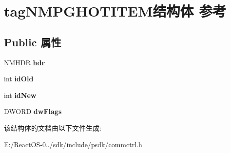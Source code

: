 \hypertarget{structtag_n_m_p_g_h_o_t_i_t_e_m}{}\section{tag\+N\+M\+P\+G\+H\+O\+T\+I\+T\+E\+M结构体 参考}
\label{structtag_n_m_p_g_h_o_t_i_t_e_m}
\subsection*{Public 属性}
\begin{DoxyCompactItemize}
\item 
\mbox{\label{structtag_n_m_p_g_h_o_t_i_t_e_m_ad6c616353de1be2d1be17c197dd1c8da}} 
\hyperlink{structtag_n_m_h_d_r}{N\+M\+H\+DR} {\bfseries hdr}
\item 
\mbox{\label{structtag_n_m_p_g_h_o_t_i_t_e_m_a33a85d57af2544f2b8cd9a98803beb02}} 
int {\bfseries id\+Old}
\item 
\mbox{\label{structtag_n_m_p_g_h_o_t_i_t_e_m_a223098f82ce7b2780e0dd037f3fc84b4}} 
int {\bfseries id\+New}
\item 
\mbox{\label{structtag_n_m_p_g_h_o_t_i_t_e_m_a074437e20cf2da620c9f2e42b8483798}} 
D\+W\+O\+RD {\bfseries dw\+Flags}
\end{DoxyCompactItemize}


该结构体的文档由以下文件生成\+:\begin{DoxyCompactItemize}
\item 
E\+:/\+React\+O\+S-\/0../sdk/include/psdk/commctrl.\+h\end{DoxyCompactItemize}
